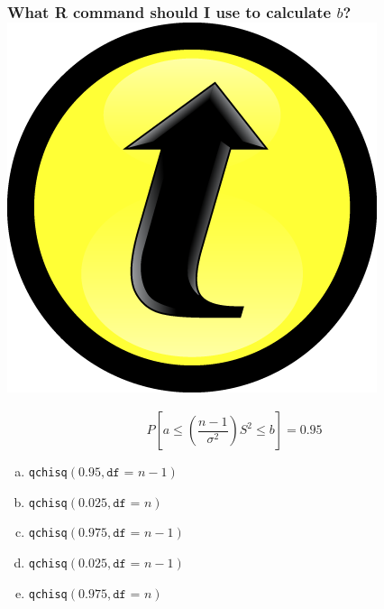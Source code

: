 \documentclass[handout]{beamer}
\begin{document}
\begin{frame}
\frametitle{What R command should I use to calculate $b$? \hfill \includegraphics[scale = 0.05]{./images/clicker}}
$$P\left[ a\leq   \left( \frac{n-1}{\sigma^2}\right)S^2 \leq b \right] = 0.95$$
	\begin{enumerate}[(a)]
		\item \texttt{qchisq}$( 0.95, \texttt{df = } n-1)$
		\item \texttt{qchisq}$( 0.025, \texttt{df = }  n)$
		\item \texttt{qchisq}$(0.975, \texttt{df = }  n-1)$
		\item \texttt{qchisq}$( 0.025, \texttt{df = }  n-1)$
		\item \texttt{qchisq}$(0.975, \texttt{df = }  n)$
	\end{enumerate}
\end{frame}
\end{document}
